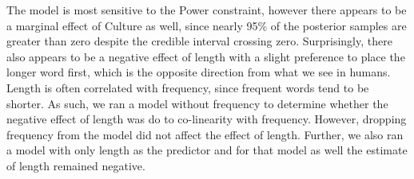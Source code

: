 \documentclass[
  12pt,
  letterpaper,
]{scrreprt}
\begin{document}
\begin{table}

\caption{\label{tbl-exp1m2}Model results examining the effect of each
individual constraint on LogOdds(AandB).}


\end{table}%

The model is most sensitive to the Power constraint, however there
appears to be a marginal effect of Culture as well, since nearly 95\% of
the posterior samples are greater than zero despite the credible
interval crossing zero. Surprisingly, there also appears to be a
negative effect of length with a slight preference to place the longer
word first, which is the opposite direction from what we see in humans.
Length is often correlated with frequency, since frequent words tend to
be shorter. As such, we ran a model without frequency to determine
whether the negative effect of length was do to co-linearity with
frequency. However, dropping frequency from the model did not affect the
effect of length. Further, we also ran a model with only length as the
predictor and for that model as well the estimate of length remained
negative.
\end{document}
